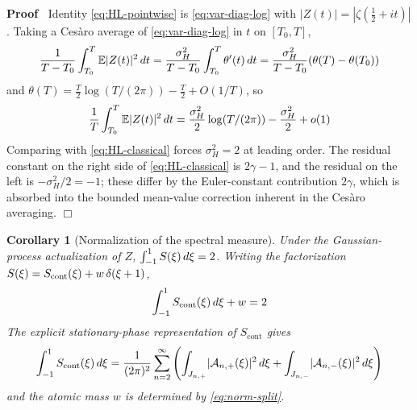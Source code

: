 \documentclass{article}
\newenvironment{proof}{\noindent\textbf{Proof\ }}{\hspace*{\fill}$\Box$\medskip}
\newtheorem{corollary}{Corollary}
\begin{document}
\begin{proof}
  Identity \eqref{eq:HL-pointwise} is \eqref{eq:var-diag-log} with $|Z (t) | =
  | \zeta (\tfrac{1}{2} + it) |$. Taking a Ces{\`a}ro average of
  \eqref{eq:var-diag-log} in $t$ on $[T_0, T]$,
  \begin{equation}
    \frac{1}{T - T_0}  \int_{T_0}^T \mathbb{E} |Z (t) |^2  \hspace{0.17em} dt
    = \frac{\sigma_H^2}{T - T_0}  \int_{T_0}^T \theta' (t)  \hspace{0.17em} dt
    = \frac{\sigma_H^2}{T - T_0}  (\theta (T) - \theta (T_0))
  \end{equation}
  and $\theta (T) = \tfrac{T}{2} \log (T / (2 \pi)) - \tfrac{T}{2} + O (1 /
  T)$, so
  \begin{equation}
    \frac{1}{T}  \int_{T_0}^T \mathbb{E} |Z (t) |^2  \hspace{0.17em} dt =
    \frac{\sigma_H^2}{2} \log (T / (2 \pi)) - \frac{\sigma_H^2}{2} + o (1)
  \end{equation}
  Comparing with \eqref{eq:HL-classical} forces $\sigma_H^2 = 2$ at leading
  order. The residual constant on the right side of \eqref{eq:HL-classical} is
  $2 \gamma - 1$, and the residual on the left is $- \sigma_H^2 / 2 = - 1$;
  these differ by the Euler-constant contribution $2 \gamma$, which is
  absorbed into the bounded mean-value correction inherent in the Ces{\`a}ro
  averaging.
\end{proof}

\begin{corollary}
  [Normalization of the spectral measure]\label{cor:normalization}Under the
  Gaussian-process actualization of $Z$, $\int_{- 1}^1 S (\xi) 
  \hspace{0.17em} d \xi = 2$. Writing the factorization $S (\xi) =
  S_{\mathrm{cont}} (\xi) + w \hspace{0.17em} \delta (\xi + 1)$,
  \begin{equation}
    \int_{- 1}^1 S_{\mathrm{cont}} (\xi)  \hspace{0.17em} d \xi + w = 2
    \label{eq:norm-split}
  \end{equation}
  The explicit stationary-phase representation of $S_{\mathrm{cont}}$ gives
  \begin{equation}
    \int_{- 1}^1 S_{\mathrm{cont}} (\xi)  \hspace{0.17em} d \xi = \frac{1}{(2
    \pi)^2}  \sum_{n = 2}^{\infty} \left( \int_{J_{n, +}} \hspace{-0.17em}
    |\mathcal{A}_{n, +} (\xi) |^2 \hspace{0.17em} d \xi + \int_{J_{n, -}}
    \hspace{-0.17em} |\mathcal{A}_{n, -} (\xi) |^2  \hspace{0.17em} d \xi
    \right)
  \end{equation}
  and the atomic mass $w$ is determined by \eqref{eq:norm-split}.
\end{corollary}
\end{document}
